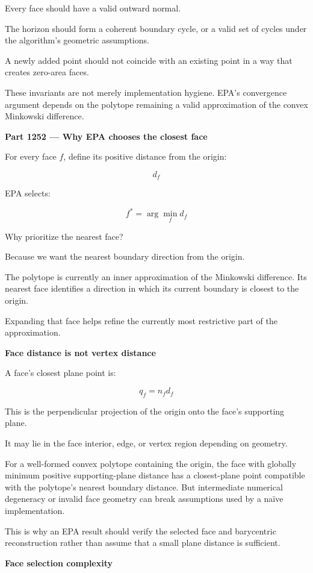 Every face should have a valid outward normal.

The horizon should form a coherent boundary cycle, or a valid set of cycles under the algorithm's geometric assumptions.

A newly added point should not coincide with an existing point in a way that creates zero-area faces.

These invariants are not merely implementation hygiene. EPA's convergence argument depends on the polytope remaining a valid approximation of the convex Minkowski difference.

\textbf{Part 1252 --- Why EPA chooses the closest face}

For every face \(f\), define its positive distance from the origin:

\[
d_f
\]

EPA selects:

\[
\boxed{ f^*=\arg\min_f d_f }
\]

Why prioritize the nearest face?

Because we want the nearest boundary direction from the origin.

The polytope is currently an inner approximation of the Minkowski difference. Its nearest face identifies a direction in which its current boundary is closest to the origin.

Expanding that face helps refine the currently most restrictive part of the approximation.

\textbf{Face distance is not vertex distance}

A face's closest plane point is:

\[
\boxed{ q_f=n_fd_f }
\]

This is the perpendicular projection of the origin onto the face's supporting plane.

It may lie in the face interior, edge, or vertex region depending on geometry.

For a well-formed convex polytope containing the origin, the face with globally minimum positive supporting-plane distance has a closest-plane point compatible with the polytope's nearest boundary distance. But intermediate numerical degeneracy or invalid face geometry can break assumptions used by a naïve implementation.

This is why an EPA result should verify the selected face and barycentric reconstruction rather than assume that a small plane distance is sufficient.

\textbf{Face selection complexity}

